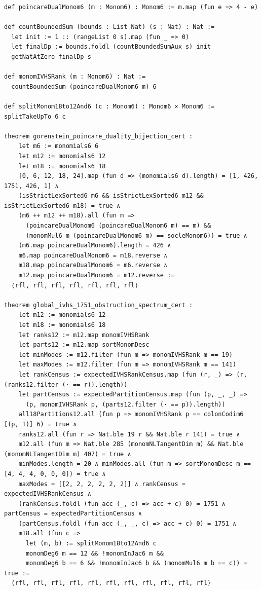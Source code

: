 \documentclass[11pt,a4paper]{article}
\begin{document}
\begin{lstlisting}[caption={Gorenstein Poincar\'e duality and global $1{,}751$-mode IVHS spectrum in \texttt{GlobalIVHSObstructionSpectrum.lean}.}]
def poincareDualMonom6 (m : Monom6) : Monom6 := m.map (fun e => 4 - e)

def countBoundedSum (bounds : List Nat) (s : Nat) : Nat :=
  let init := 1 :: (rangeList 0 s).map (fun _ => 0)
  let finalDp := bounds.foldl (countBoundedSumAux s) init
  getNatAtZero finalDp s

def monomIVHSRank (m : Monom6) : Nat :=
  countBoundedSum (poincareDualMonom6 m) 6

def splitMonom18to12And6 (c : Monom6) : Monom6 × Monom6 := splitTakeUpTo 6 c

theorem gorenstein_poincare_duality_bijection_cert :
    let m6 := monomials6 6
    let m12 := monomials6 12
    let m18 := monomials6 18
    [0, 6, 12, 18, 24].map (fun d => (monomials6 d).length) = [1, 426, 1751, 426, 1] ∧
    (isStrictLexSorted6 m6 && isStrictLexSorted6 m12 && isStrictLexSorted6 m18) = true ∧
    (m6 ++ m12 ++ m18).all (fun m =>
      (poincareDualMonom6 (poincareDualMonom6 m) == m) &&
      (monomMul6 m (poincareDualMonom6 m) == socleMonom6)) = true ∧
    (m6.map poincareDualMonom6).length = 426 ∧
    m6.map poincareDualMonom6 = m18.reverse ∧
    m18.map poincareDualMonom6 = m6.reverse ∧
    m12.map poincareDualMonom6 = m12.reverse :=
  ⟨rfl, rfl, rfl, rfl, rfl, rfl, rfl⟩

theorem global_ivhs_1751_obstruction_spectrum_cert :
    let m12 := monomials6 12
    let m18 := monomials6 18
    let ranks12 := m12.map monomIVHSRank
    let parts12 := m12.map sortMonomDesc
    let minModes := m12.filter (fun m => monomIVHSRank m == 19)
    let maxModes := m12.filter (fun m => monomIVHSRank m == 141)
    let rankCensus := expectedIVHSRankCensus.map (fun (r, _) => (r, (ranks12.filter (· == r)).length))
    let partCensus := expectedPartitionCensus.map (fun (p, _, _) =>
      (p, monomIVHSRank p, (parts12.filter (· == p)).length))
    all18Partitions12.all (fun p => monomIVHSRank p == colonCodim6 [(p, 1)] 6) = true ∧
    ranks12.all (fun r => Nat.ble 19 r && Nat.ble r 141) = true ∧
    m12.all (fun m => Nat.ble 285 (monomNLTangentDim m) && Nat.ble (monomNLTangentDim m) 407) = true ∧
    minModes.length = 20 ∧ minModes.all (fun m => sortMonomDesc m == [4, 4, 4, 0, 0, 0]) = true ∧
    maxModes = [[2, 2, 2, 2, 2, 2]] ∧ rankCensus = expectedIVHSRankCensus ∧
    (rankCensus.foldl (fun acc (_, c) => acc + c) 0) = 1751 ∧ partCensus = expectedPartitionCensus ∧
    (partCensus.foldl (fun acc (_, _, c) => acc + c) 0) = 1751 ∧
    m18.all (fun c =>
      let (m, b) := splitMonom18to12And6 c
      monomDeg6 m == 12 && !monomInJac6 m &&
      monomDeg6 b == 6 && !monomInJac6 b && (monomMul6 m b == c)) = true :=
  ⟨rfl, rfl, rfl, rfl, rfl, rfl, rfl, rfl, rfl, rfl, rfl⟩
\end{lstlisting}
\end{document}
